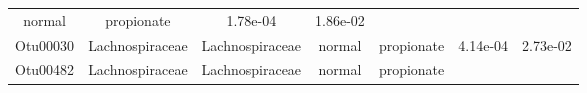 \documentclass[11pt,]{article}
\begin{document}
\begin{longtable}[]{@{}ccccccc@{}}
\begin{minipage}[t]{0.09\columnwidth}
normal\strut
\end{minipage} & \begin{minipage}[t]{0.11\columnwidth}\centering\strut
propionate\strut
\end{minipage} & \begin{minipage}[t]{0.09\columnwidth}\centering\strut
1.78e-04\strut
\end{minipage} & \begin{minipage}[t]{0.09\columnwidth}\centering\strut
1.86e-02\strut
\end{minipage}\tabularnewline
\begin{minipage}[t]{0.09\columnwidth}\centering\strut
Otu00030\strut
\end{minipage} & \begin{minipage}[t]{0.17\columnwidth}\centering\strut
Lachnospiraceae\strut
\end{minipage} & \begin{minipage}[t]{0.17\columnwidth}\centering\strut
Lachnospiraceae\strut
\end{minipage} & \begin{minipage}[t]{0.09\columnwidth}\centering\strut
normal\strut
\end{minipage} & \begin{minipage}[t]{0.11\columnwidth}\centering\strut
propionate\strut
\end{minipage} & \begin{minipage}[t]{0.09\columnwidth}\centering\strut
4.14e-04\strut
\end{minipage} & \begin{minipage}[t]{0.09\columnwidth}\centering\strut
2.73e-02\strut
\end{minipage}\tabularnewline
\begin{minipage}[t]{0.09\columnwidth}\centering\strut
Otu00482\strut
\end{minipage} & \begin{minipage}[t]{0.17\columnwidth}\centering\strut
Lachnospiraceae\strut
\end{minipage} & \begin{minipage}[t]{0.17\columnwidth}\centering\strut
Lachnospiraceae\strut
\end{minipage} & \begin{minipage}[t]{0.09\columnwidth}\centering\strut
normal\strut
\end{minipage} & \begin{minipage}[t]{0.11\columnwidth}\centering\strut
propionate\strut
\end{minipage} & \begin{minipage}[t]{0.09\columnwidth}\centering\strut

\end{minipage}
\end{longtable}
\end{document}
